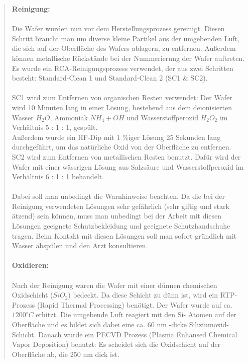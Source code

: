 \begin{quote}
            \textbf{Reinigung:}\\
			\\
            Die Wafer wurden nun vor dem Herstellungsprozess gereinigt. Diesen
            Schritt braucht man um diverse kleine Partikel aus der umgebenden
            Luft, die sich auf der Oberfläche des Wafers ablagern, zu entfernen.
            Außerdem können metallische Rückstände bei der Nummerierung der
            Wafer auftreten.\\
			Es wurde ein RCA-Reinigungsprozess verwendet, der aus zwei Schritten
			besteht: Standard-Clean 1 und Standard-Clean 2 (SC1 \& SC2).\\
			\\
			SC1 wird zum Entfernen von organischen Resten verwendet: Der Wafer wird
			10 Minuten lang in einer Lösung,  bestehend aus dem deionisierten
			Wasser $H_{2}O$, Ammoniak $NH_{4}+OH$ und Wasserstoffperoxid
			$H_{2}O_{2}$ im Verhältnis 5 : 1 : 1, gespült.\\
			Außerdem wurde ein HF-Dip mit 1 \%iger Lösung 25 Sekunden lang
			durchgeführt, um das natürliche Oxid von der Oberfläche zu
			entfernen.\\
			SC2 wird zum Entfernen von metallischen Resten benutzt. Dafür wird
			der Wafer mit einer wässrigen Lösung aus Salzsäure und
			Wasserstoffperoxid  im Verhältnis 6 : 1 : 1 behandelt.\\
			\\
			Dabei  soll man unbedingt die Warnhinweise beachten. Da die bei der
			Reinigung verwendeten Lösungen sehr gefährlich (sehr giftig und stark
			ätzend) sein können, muss man unbedingt bei der Arbeit mit diesen
			Lösungen geeignete Schutzbekleidung und geeignete Schutzhandschuhe
			tragen. Beim Kontakt mit diesen Lösungen soll man sofort gründlich
			mit Wasser abspülen und den Arzt konsultieren.\\
			\\
			\textbf{Oxidieren:}\\
			\\
			Nach der Reinigung waren die Wafer mit einer dünnen chemischen
			Oxidschicht ($SiO_{2}$)  bedeckt. Da diese Schicht zu dünn ist, wird ein
			RTP-Prozess (Rapid Thermal Processing) benötigt.  Der Wafer wurde
			auf ca. $1200^{\circ}C$ erhitzt.  Die umgebende Luft reagiert mit den Si-
			Atomen auf der Oberfläche und es bildet sich dabei eine ca. 60 nm
			-dicke Siliziumoxid- Schicht. Danach wurde ein PECVD Prozess
			(Plasma Enhansed Chemical Vapor Deposition) benutzt: Es scheidet
			sich die Oxidschicht  auf der Oberfläche ab, die 250 nm dick ist.\\

\end{quote}
